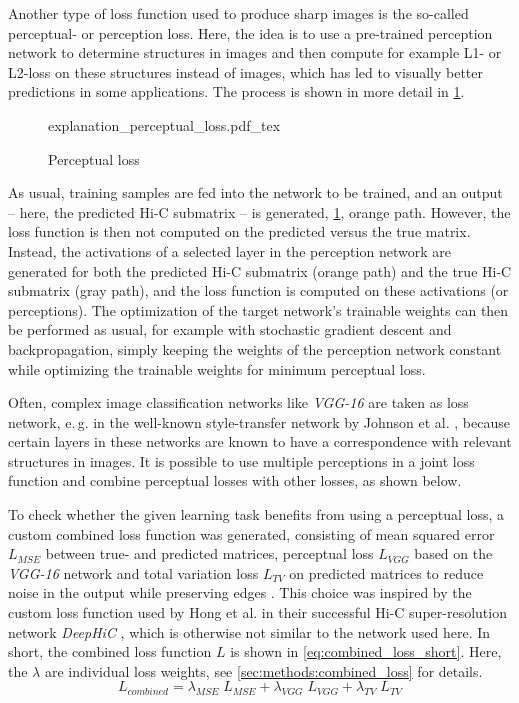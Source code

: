 Another type of loss function used to produce sharp images is the so-called perceptual- or perception loss.
Here, the idea is to use a pre-trained perception network to determine structures in images and then compute for example L1- or L2-loss on these structures instead of images,
which has led to visually better predictions in some applications.
The process is shown in more detail in \cref{fig:improve:perceptual_loss}. 
\begin{figure}[hbt]
    \small
    \centering
    {explanation_perceptual_loss.pdf_tex}%
    \caption{Perceptual loss}
    \label{fig:improve:perceptual_loss}
\end{figure}

As usual, training samples are fed into the network to be trained, and an output -- here, the predicted Hi-C submatrix -- is generated,
\cref{fig:improve:perceptual_loss}, orange path.
However, the loss function is then not computed on the predicted versus the true matrix. 
Instead, the activations of a selected layer in the perception network are generated for both the predicted Hi-C submatrix (orange path)
and the true Hi-C submatrix (gray path), and the loss function is computed on these activations (or perceptions).
The optimization of the target network's trainable weights can then be performed as usual, for example with stochastic gradient descent and backpropagation, 
simply keeping the weights of the perception network constant while optimizing the trainable weights for minimum perceptual loss.

Often, complex image classification networks like \emph{VGG-16} \cite{Simonyan2015} are taken as loss network, 
e.\,g. in the well-known style-transfer network by Johnson et al. \cite{Johnson2016},
because certain layers in these networks are known to have a correspondence with relevant structures in images.
It is possible to use multiple perceptions in a joint loss function \cite{Johnson2016} and combine perceptual losses with other losses, as shown below.

To check whether the given learning task benefits from using a perceptual loss, a custom combined loss function was generated,
consisting of mean squared error $L_\mathit{MSE}$ between true- and predicted matrices, perceptual loss $L_\mathit{VGG}$ based on the \emph{VGG-16} network 
and total variation loss $L_\mathit{TV}$ on predicted matrices to reduce noise in the output while preserving edges \cite{Rudin1992}. 
This choice was inspired by the custom loss function used by Hong et al. in their successful Hi-C super-resolution network \emph{DeepHiC} \cite{Hong2020},
which is otherwise not similar to the network used here.
In short, the combined loss function $L$ is shown in \cref{eq:combined_loss_short}. 
Here, the $\lambda$ are individual loss weights, see \cref{sec:methods:combined_loss} for details.
\begin{equation}
 L_\mathit{combined} = \lambda_\mathit{MSE} \; L_\mathit{MSE} + \lambda_\mathit{VGG} \; L_\mathit{VGG} + \lambda_\mathit{TV} \; L_\mathit{TV} \label{eq:combined_loss_short}
\end{equation}

